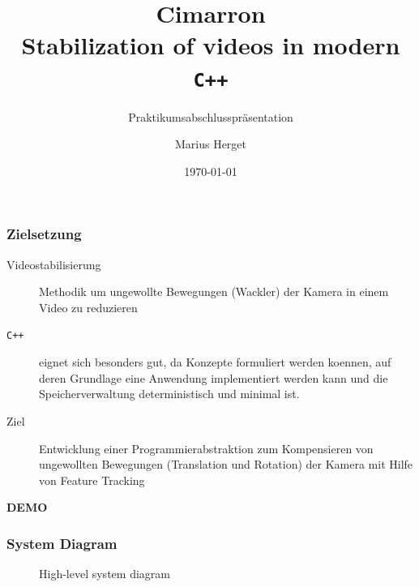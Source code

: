 \documentclass{beamer}
\title{\textbf{Cimarron}\\Stabilization of videos in modern \texttt{C++}}
\subtitle{Praktikumsabschlusspr\"asentation}
\author{Marius Herget}
\date{\today}
\institute{Institut f\"ur Informatik, LMU M\"unchen}
\begin{document}
\frame{\titlepage}

\begin{frame}
\frametitle{Zielsetzung}
\begin{description}
    \item[Videostabilisierung] Methodik um ungewollte Bewegungen (Wackler) der Kamera in einem Video zu reduzieren
    \item[\texttt{C++}] eignet sich besonders gut, da Konzepte formuliert werden koennen, auf deren Grundlage eine Anwendung implementiert werden kann und die Speicherverwaltung deterministisch und minimal ist.
    \item[Ziel] Entwicklung einer Programmierabstraktion zum Kompensieren von ungewollten Bewegungen (Translation und Rotation) der Kamera mit Hilfe von Feature Tracking
\end{description}
\end{frame}

\begin{frame}
\begin{center}
    \textbf{\huge DEMO}
\end{center}
\end{frame}

\begin{frame}
    \frametitle{System Diagram}
    \begin{figure}[h!]
        \resizebox{\textwidth}{!}{%
        }
        \caption{High-level system diagram}
    \end{figure}
\end{frame}
\end{document}

